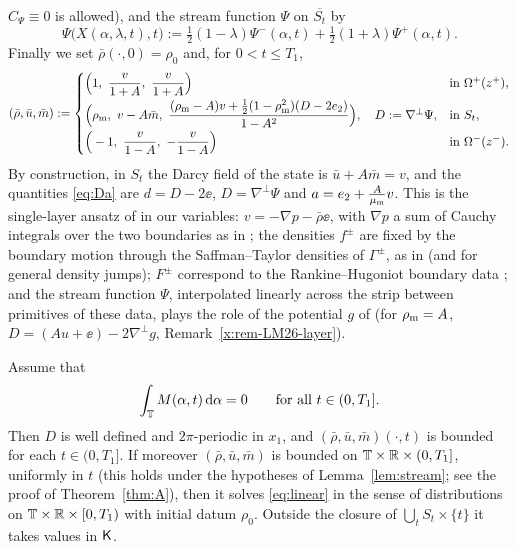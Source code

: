$C_\Psi\equiv0$ is allowed), and the stream function $\Psi$ on $\overline{S_t}$ by
\begin{equation}\label{eq:Psi}
\Psi\big(X(\alpha,\lambda,t),t\big):=\tfrac12(1-\lambda)\Psi^-(\alpha,t)+\tfrac12(1+\lambda)\Psi^+(\alpha,t).
\end{equation}
Finally we set $\bar\rho(\cdot,0)=\rho_0$ and, for $0<t\le T_1$,
\begin{equation}\label{eq:subsol}
(\bar\rho,\bar u,\bar m):=
\begin{cases}
\Big(1,\ \dfrac{v}{1+A},\ \dfrac{v}{1+A}\Big)&\text{in }\Omega^+(z^+),\\[2mm]
\Big(\rhom,\ v-A\bar m,\ \dfrac{(\rhom-A)v+\frac12(1-\rhom^2)(D-2\ee)}{1-A^2}\Big),\quad D:=\nabla^\perp\Psi, &\text{in }S_t,\\[2mm]
\Big(-1,\ \dfrac{v}{1-A},\ -\dfrac{v}{1-A}\Big)&\text{in }\Omega^-(z^-).
\end{cases}
\end{equation}
By construction, in $S_t$ the Darcy field of the state is $\bar u+A\bar m=v$, and the quantities \eqref{eq:Da} are $d=D-2\ee$, $D=\nabla^\perp\Psi$ and $a=e_2+\frac A{\mu_{\mathrm m}} v$.
This is the single-layer ansatz of \cite[Secs.~4.2--4.6]{LM26} in our variables: $v=-\nabla p-\bar\rho\ee$, with $\nabla p$ a sum of Cauchy integrals over the two boundaries as in
\cite[(4.8)]{LM26}; the densities $f^\pm$ are fixed by the boundary motion through the Saffman--Taylor densities of $\Gamma^\pm$, as in \cite[(4.7)]{LM26} (and \cite[(7.16)]{LM26} for general
density jumps); $F^\pm$ correspond to the Rankine--Hugoniot boundary data \cite[(4.12)]{LM26}; and the stream function $\Psi$, interpolated linearly across the strip between primitives of
these data, plays the role of the potential $g$ of \cite[(4.13)]{LM26} (for $\rho_{\mathrm m}=A$, $D=(Au+\ee)-2\nabla^\perp g$, Remark~\ref{x:rem-LM26-layer}).

\begin{lemma}\label{lem:linear}
Assume that
\begin{equation}\label{eq:mass-cond}
\int_{\mathbb{T}} M(\alpha,t)\,\mathrm{d}\alpha=0\qquad\text{for all }t\in(0,T_1].
\end{equation}
Then $D$ is well defined and $2\pi$-periodic in $x_1$, and $(\bar\rho,\bar u,\bar m)(\cdot,t)$ is bounded for each $t\in(0,T_1]$. If moreover $(\bar\rho,\bar u,\bar m)$ is bounded
on $\mathbb{T}\times\mathbb{R}\times(0,T_1]$, uniformly in $t$ (this holds under the hypotheses of Lemma~\ref{lem:stream}; see the proof of Theorem~\ref{thm:A}), then it solves \eqref{eq:linear} in the sense
of distributions on $\mathbb{T}\times\mathbb{R}\times[0,T_1)$ with initial datum $\rho_0$. Outside the closure of $\bigcup_t S_t\times\{t\}$ it takes values in $\mathsf{K}$.
\end{lemma}

